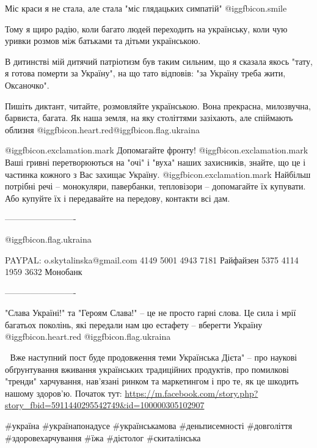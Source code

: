 Міс краси я не стала, але стала "міс глядацьких симпатій" @igg{fbicon.smile} 

Тому я щиро радію, коли багато людей переходить на українську, коли чую уривки
розмов між батьками та дітьми українською.

В дитинстві мій дитячий патріотизм був таким сильним, що я сказала якось "тату,
я готова померти за Україну", на що тато відповів: "за Україну треба жити,
Оксаночко".

Пишіть диктант, читайте, розмовляйте українською. Вона прекрасна, милозвучна,
барвиста, багата. Як наша земля, на яку століттями зазіхають, але спіймають
облизня @igg{fbicon.heart.red}@igg{fbicon.flag.ukraina}

@igg{fbicon.exclamation.mark} ️Допомагайте фронту!
@igg{fbicon.exclamation.mark} ️Ваші гривні перетворюються на "очі" і "вуха" наших захисників, знайте, що це і частинка кожного з Вас захищає Україну.
@igg{fbicon.exclamation.mark} Найбільш потрібні речі -- монокуляри, павербанки, тепловізори -- допомагайте їх купувати. Або купуйте їх і передавайте на передову, контакти всі дам.

-------------------------

@igg{fbicon.flag.ukraina}

\obeycr
PAYPAL: o.skytalinska@gmail.com
4149 5001 4943 7181 Райфайзен
5375 4114 1959 3632 Монобанк
\restorecr

-------------------------

"Слава Україні!" та "Героям Слава!" -- це не просто гарні слова. Це сила і мрії
багатьох поколінь, які передали нам цю естафету -- вберегти Україну
@igg{fbicon.heart.red} @igg{fbicon.flag.ukraina}

🥦
Вже наступний пост буде продовження теми Українська Дієта" -- про наукові
обґрунтування вживання українських традиційних продуктів, про помилкові
"тренди" харчування, нав'язані ринком та маркетингом і про те, як це шкодить
нашому здоров'ю. Початок тут:
\url{https://m.facebook.com/story.php?story_fbid=5911440295542749&id=100000305102907}

\#україна \#українапонадусе \#українськамова \#деньписемності  \#довголіття \#здоровехарчування \#їжа \#дієтолог \#скиталінська
